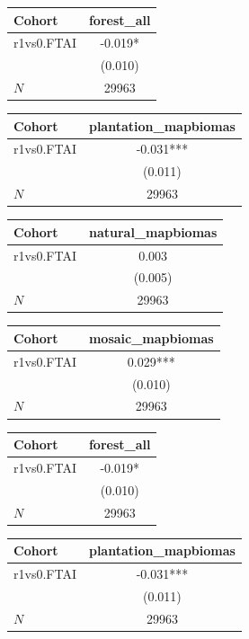 {
\def\sym#1{\ifmmode^{#1}\else\(^{#1}\)\fi}
\begin{tabular}{l*{1}{c}}
\toprule
Cohort    &forest\_all   \\
\midrule
r1vs0.FTAI&   -0.019*  \\
          &  (0.010)   \\
\midrule
\(N\)     &    29963   \\
\bottomrule
\end{tabular}
}
{
\def\sym#1{\ifmmode^{#1}\else\(^{#1}\)\fi}
\begin{tabular}{l*{1}{c}}
\toprule
Cohort    &plantation\_mapbiomas   \\
\midrule
r1vs0.FTAI&   -0.031***\\
          &  (0.011)   \\
\midrule
\(N\)     &    29963   \\
\bottomrule
\end{tabular}
}
{
\def\sym#1{\ifmmode^{#1}\else\(^{#1}\)\fi}
\begin{tabular}{l*{1}{c}}
\toprule
Cohort    &natural\_mapbiomas   \\
\midrule
r1vs0.FTAI&    0.003   \\
          &  (0.005)   \\
\midrule
\(N\)     &    29963   \\
\bottomrule
\end{tabular}
}
{
\def\sym#1{\ifmmode^{#1}\else\(^{#1}\)\fi}
\begin{tabular}{l*{1}{c}}
\toprule
Cohort    &mosaic\_mapbiomas   \\
\midrule
r1vs0.FTAI&    0.029***\\
          &  (0.010)   \\
\midrule
\(N\)     &    29963   \\
\bottomrule
\end{tabular}
}
{
\def\sym#1{\ifmmode^{#1}\else\(^{#1}\)\fi}
\begin{tabular}{l*{1}{c}}
\toprule
Cohort    &forest\_all   \\
\midrule
r1vs0.FTAI&   -0.019*  \\
          &  (0.010)   \\
\midrule
\(N\)     &    29963   \\
\bottomrule
\end{tabular}
}
{
\def\sym#1{\ifmmode^{#1}\else\(^{#1}\)\fi}
\begin{tabular}{l*{1}{c}}
\toprule
Cohort    &plantation\_mapbiomas   \\
\midrule
r1vs0.FTAI&   -0.031***\\
          &  (0.011)   \\
\midrule
\(N\)     &    29963   \\
\bottomrule
\end{tabular}
}
